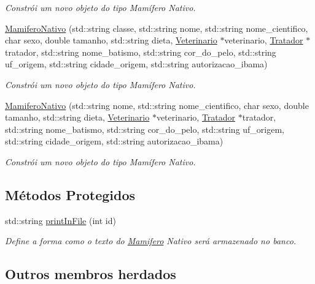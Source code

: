 \begin{DoxyCompactItemize}
\begin{DoxyCompactList}\small\item\em Constrói um novo objeto do tipo Mamífero Nativo. \end{DoxyCompactList}\item 
\hyperlink{classMamiferoNativo_a33beb16c02c8d9c932bd4a1dd40c0793}{Mamifero\+Nativo} (std\+::string classe, std\+::string nome, std\+::string nome\+\_\+cientifico, char sexo, double tamanho, std\+::string dieta, \hyperlink{classVeterinario}{Veterinario} $\ast$veterinario, \hyperlink{classTratador}{Tratador} $\ast$tratador, std\+::string nome\+\_\+batismo, std\+::string cor\+\_\+do\+\_\+pelo, std\+::string uf\+\_\+origem, std\+::string cidade\+\_\+origem, std\+::string autorizacao\+\_\+ibama)
\begin{DoxyCompactList}\small\item\em Constrói um novo objeto do tipo Mamífero Nativo. \end{DoxyCompactList}\item 
\hyperlink{classMamiferoNativo_aeec3356191f1b6e80ab495a9016b5dae}{Mamifero\+Nativo} (std\+::string nome, std\+::string nome\+\_\+cientifico, char sexo, double tamanho, std\+::string dieta, \hyperlink{classVeterinario}{Veterinario} $\ast$veterinario, \hyperlink{classTratador}{Tratador} $\ast$tratador, std\+::string nome\+\_\+batismo, std\+::string cor\+\_\+do\+\_\+pelo, std\+::string uf\+\_\+origem, std\+::string cidade\+\_\+origem, std\+::string autorizacao\+\_\+ibama)
\begin{DoxyCompactList}\small\item\em Constrói um novo objeto do tipo Mamífero Nativo. \end{DoxyCompactList}\end{DoxyCompactItemize}
\subsection*{Métodos Protegidos}
\begin{DoxyCompactItemize}
\item 
std\+::string \hyperlink{classMamiferoNativo_ae2f2b00cb6720cea2780ebef78be52ea}{print\+In\+File} (int id)
\begin{DoxyCompactList}\small\item\em Define a forma como o texto do \hyperlink{classMamifero}{Mamifero} Nativo será armazenado no banco. \end{DoxyCompactList}\end{DoxyCompactItemize}
\subsection*{Outros membros herdados}


